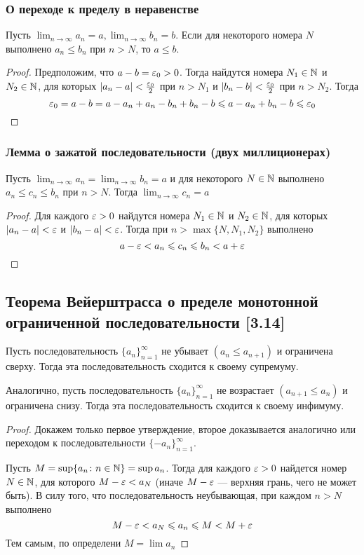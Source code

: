 \documentclass[12pt, a4paper]{article}
\begin{document}
    \subsubsection{О переходе к пределу в неравенстве}
    Пусть $ \lim_{n \to \infty} a_n = a,  \lim_{n \to \infty} b_n = b$. Если для некоторого номера $N$ выполнено $a_n \leq b_n$ при $n > N$, то $a \leq b$.
    \begin{proof}
        Предположим, что $a - b = \varepsilon_0 > 0$. Тогда найдутся номера $N_1 \in \mathbb{N}$ и $N_2 \in \mathbb{N}$, для которых $|a_n - a| < \frac{\varepsilon_0}{2}$ при $n > N_1$ и $|b_n - b| < \frac{\varepsilon_0}{2}$ при $n > N_2$. Тогда 
        \begin{equation*}
            \varepsilon_0 = a - b = a - a_n + a_n - b_n + b_n - b \leqslant a - a_n + b_n - b \leqslant \varepsilon_0
        \end{equation*}
    \end{proof}
    \subsubsection{Лемма о зажатой последовательности (двух миллиционерах)}
    Пусть $ \lim_{n \to \infty} a_n =  \lim_{n \to \infty} b_n = a$ и для некоторого $N \in \mathbb{N}$ выполнено $a_n \leq c_n \leq b_n$ при $n > N$. Тогда $ \lim_{n \to \infty} c_n = a$
    \begin{proof}
    Для каждого $\varepsilon > 0$ найдутся номера $N_1 \in \mathbb{N}$ и $N_2 \in \mathbb{N}$, для которых $|a_n - a| < \varepsilon$ и $|b_n - a| < \varepsilon$. Тогда при $n > \max \{N, N_1, N_2\}$ выполнено
    \begin{equation*}
        a - \varepsilon < a_n \leqslant c_n \leqslant b_n < a + \varepsilon
    \end{equation*}
    \end{proof}
    \subsection{Теорема Вейерштрасса о пределе монотонной ограниченной последовательности [3.14]}
    Пусть последовательность $\{a_n\}^{\infty}_{n=1}$ не убывает $(a_n \leq a_{n + 1})$ и ограничена сверху. Тогда эта последовательность сходится к своему супремуму.

    Аналогично, пусть последовательность $\{a_n\}^{\infty}_{n=1}$ не возрастает $(a_{n+1} \leq a_n)$ и ограничена снизу. Тогда эта последовательность сходится к своему инфимуму.
    \begin{proof}
    Докажем только первое утверждение, второе доказывается аналогично или переходом к последовательности $\{-a_n\}^{\infty}_{n=1}$.

    Пусть $M = \sup \{a_n \colon n \in \mathbb{N} \} = \sup a_n$. Тогда для каждого $\varepsilon > 0$ найдется номер $N \in \mathbb{N}$, для которого $M - \varepsilon < a_{N}$ (иначе $M - \varepsilon$ --- верхняя грань, чего не может быть). В силу того, что последовательность неубывающая, при каждом $n > N$ выполнено
    \begin{equation*}
        M - \varepsilon < a_{N} \leqslant a_n \leqslant M < M + \varepsilon
    \end{equation*}
    Тем самым, по определени $M = \lim a_n$
    \end{proof}
\end{document}
